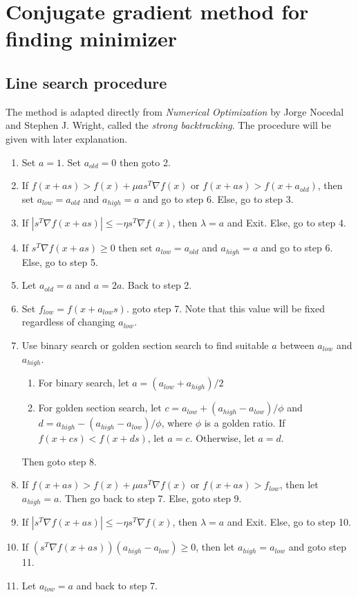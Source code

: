 \documentclass{article}
\begin{document}
\section*{Conjugate gradient method for finding minimizer}

\subsection*{Line search procedure}

The method is adapted directly from \emph{Numerical Optimization} by Jorge Nocedal and Stephen J. Wright, called the \emph{strong backtracking}. The procedure will be given with later explanation.
\begin{enumerate}
    \item Set $a = 1$. Set $a_{old} = 0$ then goto 2.
    \item If $f(x + as) > f(x) + \mu a s^T \nabla f(x)$ or $f(x + a s) > f(x + a_{old})$, then set $a_{low} = a_{old}$ and $a_{high} = a$ and go to step 6. Else, go to step 3.
    \item If $|s^T \nabla f(x + as)| \leq -\eta s^T \nabla f(x)$, then $\lambda = a$ and Exit. Else, go to step 4.
    \item If $s^T \nabla f(x + as) \geq 0$ then set $a_{low} = a_{old}$ and $a_{high} = a$ and go to step 6. Else, go to step 5.
    \item Let $a_{old} = a$ and $a = 2a$. Back to step 2.
    \item Set $f_{low} = f(x + a_{low}s)$. goto step 7. Note that this value will be fixed regardless of changing $a_{low}$.
    \item Use binary search or golden section search to find suitable $a$ between $a_{low}$ and $a_{high}$.
    \begin{enumerate}
        \item For binary search, let $a = (a_{low} + a_{high})/2$
        \item For golden section search, let $c = a_{low} + (a_{high} - a_{low})/\phi$ and $d = a_{high} - (a_{high} - a_{low})/\phi$, where $\phi$ is a golden ratio. If $f(x + cs) < f(x + ds)$, let $a = c$. Otherwise, let $a = d$.
    \end{enumerate}
    Then goto step 8.
    \item If $f(x + as) > f(x) + \mu a s^T \nabla f(x)$ or $f(x + a s) > f_{low}$, then let $a_{high} = a$. Then go back to step 7. Else, goto step 9.
    \item If $|s^T \nabla f(x + as)| \leq -\eta s^T \nabla f(x)$, then $\lambda = a$ and Exit. Else, go to step 10.
    \item If $(s^T \nabla f(x + as))(a_{high} - a_{low}) \geq 0$, then let $a_{high} = a_{low}$ and goto step 11.
    \item Let $a_{low} = a$ and back to step 7.
\end{enumerate}
\end{document}
